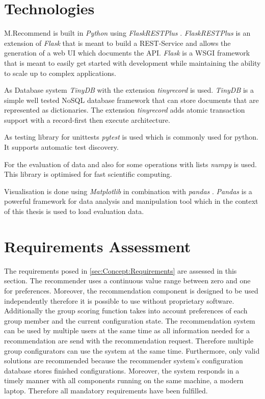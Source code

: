 \section{Technologies}
\label{sec:DesignImplementation:Technologies}

M.Recommend is built in \emph{Python} \cite{PythonOrg} using \emph{FlaskRESTPlus} \cite{FlaskRESTPlus13Documentation}. \emph{FlaskRESTPlus} is an extension of \emph{Flask} \cite{FlaskDocumentation} that is meant to build a REST-Service and allows the generation of a web UI which documents the API. \emph{Flask} is a WSGI \cite{WhatWSGI} framework that is meant to easily get started with development while maintaining the ability to scale up to complex applications.

As Database system \emph{TinyDB} \cite{TinyDB15Documentation} with the extension \emph{tinyrecord} \cite{junEugeneeeoTinyrecord2020} is used. \emph{TinyDB} is a simple well tested NoSQL database framework that can store documents that are represented as dictionaries. The extension \emph{tinyrecord} adds atomic transaction support with a record-first then execute architecture.

As testing library for unittests \emph{pytest} \cite{PytestDocumentation} is used which is commonly used for python. It supports automatic test discovery.

For the evaluation of data and also for some operations with lists \emph{numpy} \cite{NumPy} is used. This library is optimised for fast scientific computing. 

Visualisation is done using \emph{Matplotlib} \cite{MatplotlibDocumentation} in combination with \emph{pandas} \cite{PandasPythonData}. \emph{Pandas} is a powerful framework for data analysis and manipulation tool which in the context of this thesis is used to load evaluation data.


\section{Requirements Assessment}
\label{sec:DesignImplementation:RequirementsAssesment}

The requirements posed in \autoref{sec:Concept:Requirements} are assessed in this section. The recommender uses a continuous value range between zero and one for preferences. Moreover, the recommendation component is designed to be used independently therefore it is possible to use without proprietary software.
Additionally the group scoring function takes into account preferences of each group member and the current configuration state. The recommendation system can be used by multiple users at the same time as all information needed for a recommendation are send with the recommendation request. Therefore multiple group configurators can use the system at the same time. Furthermore, only valid solutions are recommended because the recommender system's configuration database stores finished configurations. Moreover, the system responds in a timely manner with all components running on the same machine, a modern laptop.
Therefore all mandatory requirements have been fulfilled.

